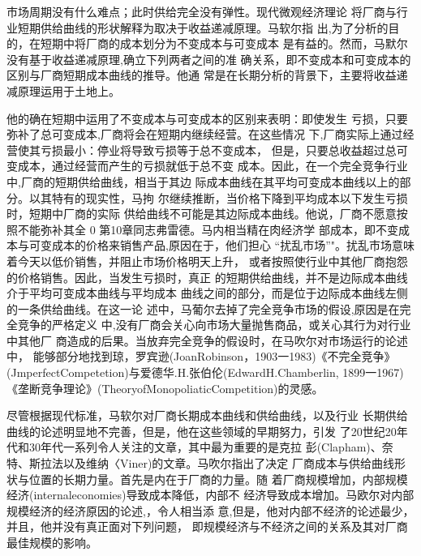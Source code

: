 市场周期没有什么难点；此时供给完全没有弹性。现代微观经济理论
将厂商与行业短期供给曲线的形状解释为取决于收益递减原理。马软尔指
出,为了分析的目的，在短期中将厂商的成本划分为不变成本与可变成本
是有益的。然而，马默尔没有基于收益递减原理,确立下列两者之间的准
确关系，即不变成本和可变成本的区别与厂商短期成本曲线的推导。他通
常是在长期分析的背景下，主要将收益递减原理运用于土地上。

他的确在短期中运用了不变成本与可变成本的区别来表明：即使发生
亏损，只要弥补了总可变成本,厂商将会在短期内继续经营。在这些情况
下,厂商实际上通过经营使其亏损最小：停业将导致亏损等于总不变成本，
但是，只要总收益超过总可变成本，通过经营而产生的亏损就低于总不变
成本。因此，在一个完全竞争行业中,厂商的短期供给曲线，相当于其边
际成本曲线在其平均可变成本曲线以上的部分。以其特有的现实性，马拘
尔继续推断，当价格下降到平均成本以下发生亏损时，短期中厂商的实际
供给曲线不可能是其边际成本曲线。他说，厂商不愿意按照不能弥补其全
0
第10章同志弗雷德。马内相当精在肉经济学
部成本，即不变成本与可变成本的价格来销售产品,原因在于，他们担心
“扰乱市场”"。扰乱市场意味着今天以低价销售，并阻止市场价格明天上升，
或者按照使行业中其他厂商抱怨的价格销售。因此，当发生亏损时，真正
的短期供给曲线，并不是边际成本曲线介于平均可变成本曲线与平均成本
曲线之间的部分，而是位于边际成本曲线左侧的一条供给曲线。在这一论
述中，马葡尔去掉了完全竞争市场的假设,原因是在完全竞争的严格定义
中,没有厂商会关心向市场大量抛售商品，或关心其行为对行业中其他厂
商造成的后果。当放弃完全竞争的假设时，在马吹尔对市场运行的论述中，
能够部分地找到琼，罗宾逊(JoanRobinson，1903一1983)《不完全竞争》
(JmperfectCompetetion)与爱德华.H.张伯伦(EdwardH.Chamberlin,
1899一1967)《垄断竞争理论》(TheoryofMonopoliaticCompetition)的灵感。

尽管根据现代标准，马软尔对厂商长期成本曲线和供给曲线，以及行业
长期供给曲线的论述明显地不完善，但是，他在这些领域的早期努力，引发
了20世纪20年代和30年代一系列令人关注的文章，其中最为重要的是克拉
彭(Clapham)、奈特、斯拉法以及维纳〈Viner)的文章。马吹尔指出了决定
厂商成本与供给曲线形状与位置的长期力量。首先是内在于厂商的力量。随
着厂商规模增加，内部规模经济(internaleconomies)导致成本降低，内部不
经济导致成本增加。马欧尔对内部规模经济的经济原因的论述,，令人相当添
意,但是，他对内部不经济的论述最少，并且，他并没有真正面对下列问题，
即规模经济与不经济之间的关系及其对厂商最佳规模的影响。

